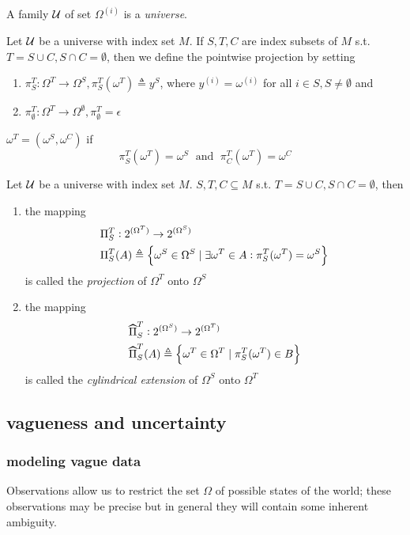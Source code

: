 \documentclass[11pt]{article}
\begin{document}
A family \(\mathcal{U}\) of set \(\Omega^{(i)}\) is a \emph{universe}.

\begin{definition}[]
Let \(\mathcal{U}\) be a universe with index set \(M\). If \(S,T,C\) are index subsets of
\(M\) s.t. \(T=S\cup C,S\cap C=\emptyset\), then we define the pointwise
projection by setting
\begin{enumerate}
\item \(\pi_S^T:\Omega^T\to\Omega^S,\pi^T_S(\omega^T)\triangleq y^S\), where 
\(y^{(i)}=\omega^{(i)}\) for all \(i\in S,S\neq\emptyset\) and
\item \(\pi^T_\emptyset:\Omega^T\to\Omega^{\emptyset},\pi^T_\emptyset=\epsilon\)
\end{enumerate}


\(\omega^T=(\omega^S,\omega^C)\) if 
\begin{equation*}
\pi^T_S(\omega^T)=\omega^S\;\text{ and }\; \pi^T_C(\omega^T)=\omega^C
\end{equation*}
\end{definition}

\begin{definition}[]
Let \(\mathcal{U}\) be a universe with index set \(M\). \(S,T,C\subseteq M\) s.t.
\(T=S\cup C,S\cap C=\emptyset\), then
\begin{enumerate}
\item the mapping
\begin{align*}
&\Pi^T_S:2^{(\Omega^T)}\to 2^{(\Omega^S)}\\
&\Pi^T_S(A)\triangleq\left\{\omega^S\in\Omega^S\mid\exists\omega^T\in A:
\pi^T_S(\omega^T)=\omega^S\right\}
\end{align*}
is called the \emph{projection} of \(\Omega^T\) onto \(\Omega^S\)
\item the mapping
\begin{align*}
&\what{\Pi}^T_S:2^{(\Omega^S)}\to 2^{(\Omega^T)}\\
&\what{\Pi}^T_S(A)\triangleq\lb\omega^T\in\Omega^T\mid\pi^T_S(\omega^T)\in B\rb\\
\end{align*}
is called the \emph{cylindrical extension} of \(\Omega^S\) onto \(\Omega^T\)
\end{enumerate}
\end{definition}
\subsection{vagueness and uncertainty}
\label{sec:orgf1dd632}
\subsubsection{modeling vague data}
\label{sec:orgee90c47}
Observations allow us to restrict the set \(\Omega\) of possible states of the world;
these observations may be precise but in general they will contain some inherent ambiguity.
\end{document}

